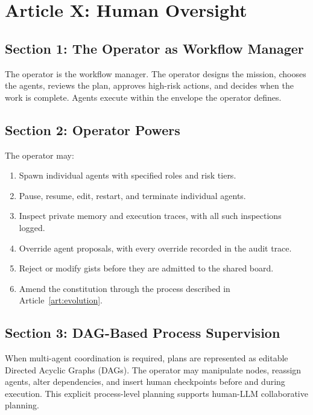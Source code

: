 \documentclass[12pt,letterpaper]{article}
\begin{document}
\section{Article X: Human Oversight}
\label{art:oversight}

\subsection{Section 1: The Operator as Workflow Manager}

The operator is the workflow manager. The operator designs the mission, chooses the agents, reviews the plan, approves high-risk actions, and decides when the work is complete. Agents execute within the envelope the operator defines.

\subsection{Section 2: Operator Powers}

The operator may:

\begin{enumerate}
    \item Spawn individual agents with specified roles and risk tiers.
    \item Pause, resume, edit, restart, and terminate individual agents.
    \item Inspect private memory and execution traces, with all such inspections logged.
    \item Override agent proposals, with every override recorded in the audit trace.
    \item Reject or modify gists before they are admitted to the shared board.
    \item Amend the constitution through the process described in Article~\ref{art:evolution}.
\end{enumerate}

\subsection{Section 3: DAG-Based Process Supervision}

When multi-agent coordination is required, plans are represented as editable Directed Acyclic Graphs (DAGs). The operator may manipulate nodes, reassign agents, alter dependencies, and insert human checkpoints before and during execution. This explicit process-level planning supports human-LLM collaborative planning.
\end{document}
